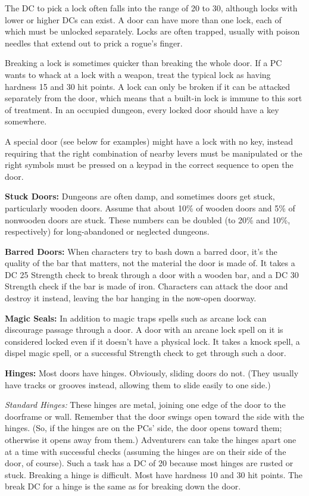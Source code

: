 The  DC to pick a lock often falls into the range of 20 to 30, although locks with lower or higher DCs can exist. A door can have more than one lock, each of which must be unlocked separately. Locks are often trapped, usually with poison needles that extend out to prick a rogue's finger.

Breaking a lock is sometimes quicker than breaking the whole door. If a PC wants to whack at a lock with a weapon, treat the typical lock as having hardness 15 and 30 hit points. A lock can only be broken if it can be attacked separately from the door, which means that a built-in lock is immune to this sort of treatment. In an occupied dungeon, every locked door should have a key somewhere.

A special door (see below for examples) might have a lock with no key, instead requiring that the right combination of nearby levers must be manipulated or the right symbols must be pressed on a keypad in the correct sequence to open the door.

\textbf{Stuck Doors:} Dungeons are often damp, and sometimes doors get stuck, particularly wooden doors. Assume that about 10\% of wooden doors and 5\% of nonwooden doors are stuck. These numbers can be doubled (to 20\% and 10\%, respectively) for long-abandoned or neglected dungeons.

\textbf{Barred Doors:} When characters try to bash down a barred door, it's the quality of the bar that matters, not the material the door is made of. It takes a DC 25 Strength check to break through a door with a wooden bar, and a DC 30 Strength check if the bar is made of iron. Characters can attack the door and destroy it instead, leaving the bar hanging in the now-open doorway.

\textbf{Magic Seals:} In addition to magic traps spells such as arcane lock can discourage passage through a door. A door with an arcane lock spell on it is considered locked even if it doesn't have a physical lock. It takes a knock spell, a dispel magic spell, or a successful Strength check to get through such a door.

\textbf{Hinges:} Most doors have hinges. Obviously, sliding doors do not. (They usually have tracks or grooves instead, allowing them to slide easily to one side.)

\textit{Standard Hinges:} These hinges are metal, joining one edge of the door to the doorframe or wall. Remember that the door swings open toward the side with the hinges. (So, if the hinges are on the PCs' side, the door opens toward them; otherwise it opens away from them.) Adventurers can take the hinges apart one at a time with successful  checks (assuming the hinges are on their side of the door, of course). Such a task has a DC of 20 because most hinges are rusted or stuck. Breaking a hinge is difficult. Most have hardness 10 and 30 hit points. The break DC for a hinge is the same as for breaking down the door.

